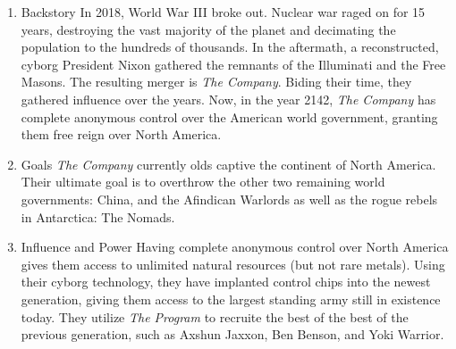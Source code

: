 \documentclass[11pt]{article}
\begin{document}
\begin{enumerate}
\item Backstory
\label{sec:orgd6138e5}
In 2018, World War III broke out. Nuclear war raged on for 15 years, destroying the vast majority of the planet and decimating the population to the hundreds of thousands. In the aftermath, a reconstructed, cyborg President Nixon gathered the remnants of the Illuminati and the Free Masons. The resulting merger is \emph{The Company}. Biding their time, they gathered influence over the years. Now, in the year 2142, \emph{The Company} has complete anonymous control over the American world government, granting them free reign over North America.

\item Goals
\label{sec:orga2627d4}
\emph{The Company} currently olds captive the continent of North America. Their ultimate goal is to overthrow the other two remaining world governments: China, and the Afindican Warlords as well as the rogue rebels in Antarctica: The Nomads.

\item Influence and Power
\label{sec:orgbd553f1}
Having complete anonymous control over North America gives them access to unlimited natural resources (but not rare metals). Using their cyborg technology, they have implanted control chips into the newest generation, giving them access to the largest standing army still in existence today. They utilize \emph{The Program} to recruite the best of the best of the previous generation, such as Axshun Jaxxon, Ben Benson, and Yoki Warrior.
\end{enumerate}
\end{document}

